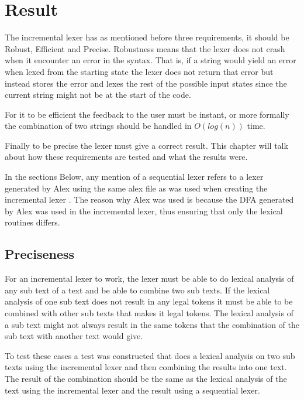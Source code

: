 \chapter{Result}
The incremental lexer has as mentioned before three requirements, it should be
Robust, Efficient and Precise. Robustness means that the lexer does not crash
when it encounter an error in the syntax. That is, if a string would yield an
error when lexed from the starting state the lexer does not return that error but
instead stores the error and lexes the rest of the possible input states since
the current string might not be at the start of the code.

For it to be efficient
the feedback to the user must be instant, or more formally the combination of two
strings should be handled in $O(log(n))$ time.

Finally to be precise the lexer
must give a correct result. This chapter will talk about how these requirements
are tested and what the results were.

In the sections Below, any mention of a sequential lexer refers to a lexer
generated by Alex using the same alex file as was used when creating the
incremental lexer \cite{alex}. The reason why Alex was used is because the DFA
generated by Alex was used in the incremental lexer, thus ensuring that only the
lexical routines differs.

\section{Preciseness}
For an incremental lexer to work, the lexer must be able to do lexical analysis
of any sub text of a text and be able to combine two sub texts. If the lexical
analysis of one sub text does not result in any legal tokens it must be able to be
combined with other sub texts that makes it legal tokens. The lexical analysis of
a sub text might not always result in the same tokens that the combination of the
sub text with another text would give.

To test these cases a test was constructed that does a lexical analysis on two
sub texts using the incremental lexer and then combining the results into one
text. The result of the combination should be the same as the lexical analysis
of the text using the incremental lexer and the result using a sequential lexer.

